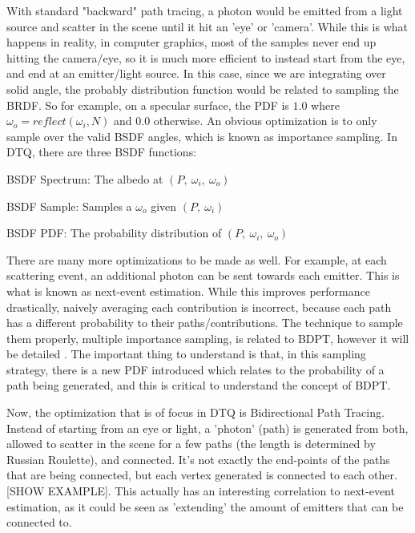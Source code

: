 \documentclass{article}
\begin{document}
  With standard "backward" path tracing, a photon would be emitted from a light
source and scatter in the scene until it hit an 'eye' or 'camera'. While this is
what happens in reality, in computer graphics, most of the samples never end up
hitting the camera/eye, so it is much more efficient to instead start from the
eye, and end at an emitter/light source. In this case, since we are integrating
over solid angle, the probably distribution function would be related to
sampling the BRDF. So for example, on a specular surface, the PDF is $1.0$ where
$\omega_o = reflect(\omega_i, N)$ and $0.0$ otherwise. An obvious optimization
is to only sample over the valid BSDF angles, which is known as importance
sampling. In DTQ, there are three BSDF functions:
  
  \begin{list}{}{}
  \item BSDF Spectrum: The albedo at $(P,\:\omega_i,\:\omega_o)$
  \item BSDF Sample: Samples a $\omega_o$ given $(P,\:\omega_i)$
  \item BSDF PDF: The probability distribution of $(P,\:\omega_i,\:\omega_o)$
  \end{list}
  
  There are many more optimizations to be made as well. For example, at each
scattering event, an additional photon can be sent towards each emitter. This is
what is known as next-event estimation. While this improves performance
drastically, naively averaging each contribution is incorrect, because each path
has a different probability to their paths/contributions. The technique to
sample them properly, multiple importance sampling, is related to BDPT, however
it will be detailed . The important thing to understand is that, in this
sampling strategy, there is a new PDF introduced which relates to the
probability of a path being generated, and this is critical to understand the
concept of BDPT.
  
  Now, the optimization that is of focus in DTQ is Bidirectional Path Tracing.
Instead of starting from an eye or light, a 'photon' (path) is generated from
both, allowed to scatter in the scene for a few paths (the length is determined
by Russian Roulette), and connected. It's not exactly the end-points of the
paths that are being connected, but each vertex generated is connected to each
other. [SHOW EXAMPLE]. This actually has an interesting correlation to
next-event estimation, as it could be seen as 'extending' the amount of emitters
that can be connected to.
  
\end{document}
